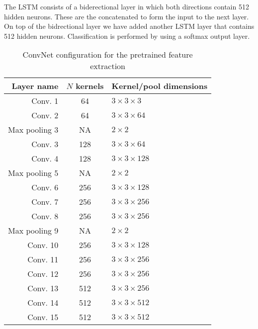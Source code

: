 The LSTM consists of a biderectional layer in which both directions contain 512 hidden neurons. These are the concatenated to form the input to the next layer. On top of the bidrectional layer we have added another LSTM layer that contains 512 hidden neurons. Classification is performed by using a softmax output layer.
\begin{table}
\renewcommand{\arraystretch}{1.3}
\centering
\caption{ConvNet configuration for the pretrained feature extraction}
\begin{tabular}{r|cl}\hline
Layer name & $N$ kernels & Kernel/pool dimensions \\ \hline \hline
Conv. 1 & 64 & $3 \times 3 \times 3$  \\
Conv. 2 & 64 & $3 \times 3 \times 64$ \\
Max pooling 3 & NA & $2\times 2$ \\
Conv. 3 & 128 & $3 \times 3 \times 64$ \\
Conv. 4 & 128 & $3 \times 3 \times 128$ \\
Max pooling 5 & NA & $2\times 2$ \\
Conv. 6 & 256 & $3 \times 3 \times 128$ \\
Conv. 7 & 256 & $3 \times 3 \times 256$ \\
Conv. 8 & 256 & $3 \times 3 \times 256$ \\
Max pooling 9 & NA & $2\times 2$ \\
Conv. 10 & 256 & $3 \times 3 \times 128$ \\
Conv. 11 & 256 & $3 \times 3 \times 256$ \\
Conv. 12 & 256 & $3 \times 3 \times 256$ \\
Conv. 13 & 512 & $3 \times 3 \times 256$ \\
Conv. 14 & 512 & $3 \times 3 \times 512$ \\
Conv. 15 & 512 & $3 \times 3 \times 512$ \\ \hline
\end{tabular}
\label{tab:convconf}
\end{table}
